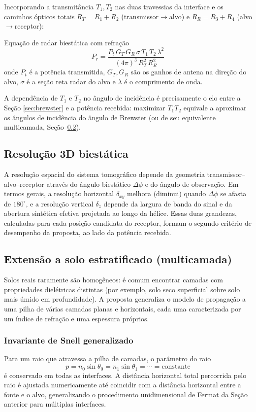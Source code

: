 \documentclass[11pt,a4paper]{article}
\newcommand{\RT}{R_T}
\newcommand{\RR}{R_R}
\newcommand{\Prcv}{P_r}
\newcommand{\Pt}{P_t}
\newcommand{\dxy}{\delta_{xy}}
\newcommand{\dz}{\delta_z}
\begin{document}
Incorporando a transmitância $T_1,T_2$ nas duas travessias da interface e os caminhos ópticos
totais $\RT=R_1+R_2$ (transmissor$\to$alvo) e $\RR=R_3+R_4$ (alvo$\to$receptor):
\begin{resultado}{Equação de radar biestática com refração}
\[
\boxed{\Prcv = \frac{\Pt\,G_T\,G_R\,\sigma\,T_1\,T_2\,\lambda^2}{(4\pi)^3\,\RT^2\,\RR^2}}
\]
onde $\Pt$ é a potência transmitida, $G_T,G_R$ são os ganhos de antena na direção do alvo, $\sigma$
é a seção reta radar do alvo e $\lambda$ é o comprimento de onda.
\end{resultado}
A dependência de $T_1$ e $T_2$ no ângulo de incidência é precisamente o elo entre a Seção
\ref{sec:brewster} e a potência recebida: maximizar $T_1T_2$ equivale a aproximar os ângulos de
incidência do ângulo de Brewster (ou de seu equivalente multicamada, Seção~\ref{sec:multicamada}).

\subsection{Resolução 3D biestática}

A resolução espacial do sistema tomográfico depende da geometria transmissor--alvo--receptor
através do ângulo biestático $\Delta\phi$ e do ângulo de observação. Em termos gerais, a resolução
horizontal $\dxy$ melhora (diminui) quando $\Delta\phi$ se afasta de $180^\circ$, e a resolução
vertical $\dz$ depende da largura de banda do sinal e da abertura sintética efetiva projetada ao
longo da hélice. Essas duas grandezas, calculadas para cada posição candidata do receptor, formam
o segundo critério de desempenho da proposta, ao lado da potência recebida.

\subsection{Extensão a solo estratificado (multicamada)}
\label{sec:multicamada}

Solos reais raramente são homogêneos: é comum encontrar camadas com propriedades dielétricas
distintas (por exemplo, solo seco superficial sobre solo mais úmido em profundidade). A proposta
generaliza o modelo de propagação a uma pilha de várias camadas planas e horizontais, cada uma
caracterizada por um índice de refração e uma espessura próprios.

\subsubsection{Invariante de Snell generalizado}
Para um raio que atravessa a pilha de camadas, o parâmetro do raio
\[
p = n_0\sin\theta_0 = n_1\sin\theta_1 = \cdots = \text{constante}
\]
é conservado em todas as interfaces. A distância horizontal total percorrida pelo raio é ajustada
numericamente até coincidir com a distância horizontal entre a fonte e o alvo, generalizando o
procedimento unidimensional de Fermat da Seção anterior para múltiplas interfaces.
\end{document}

